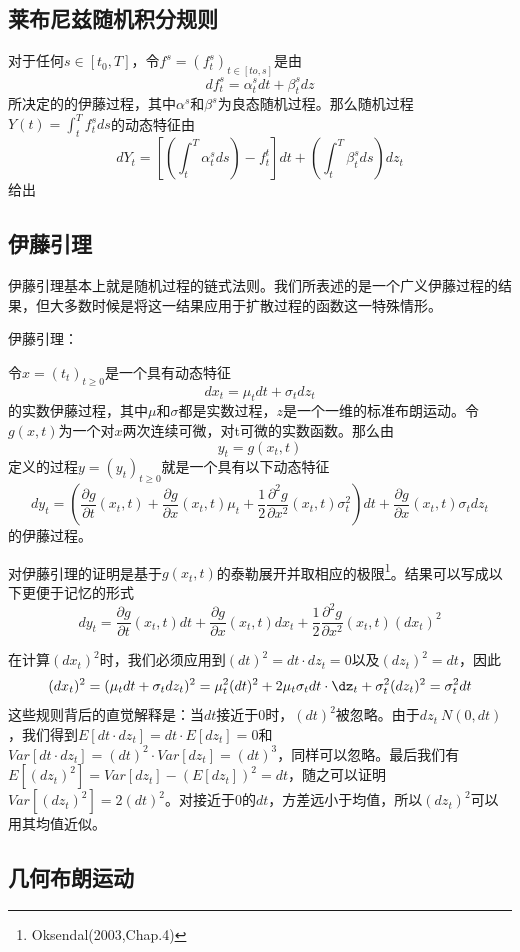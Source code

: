 \documentclass[UTF8]{ctexart}
\newcommand \qd[1] {\begin{qds} {#1} \end{qds}}
\begin{document}
\subsection{莱布尼兹随机积分规则}

对于任何$s \in [t_0,T]$，令$f^s=(f_t^s)_{t \in [to,s]}$是由$$df_t^s=\alpha_t^s dt+\beta_t^s dz$$所决定的的伊藤过程，其中$\alpha^s$和$\beta^s$为良态随机过程。那么随机过程$Y(t)=\int_t^T f_t^s ds$的动态特征由$$dY_t=[(\int_t^T \alpha_t^s ds)-f_t^t]dt+(\int_t^T \beta_t^s ds)dz_t$$给出

\subsection{伊藤引理}

伊藤引理基本上就是随机过程的链式法则。我们所表述的是一个广义伊藤过程的结果，但大多数时候是将这一结果应用于扩散过程的函数这一特殊情形。

\qd{伊藤引理：}令$x=(t_t)_{t \geqslant 0}$是一个具有动态特征$$dx_t=\mu_t dt +\sigma_t dz_t$$的实数伊藤过程，其中$\mu$和$\sigma$都是实数过程，$z$是一个一维的标准布朗运动。令$g(x,t)$为一个对$x$两次连续可微，对t可微的实数函数。那么由$$y_t=g(x_t,t)$$定义的过程$y=(y_t)_{t \geqslant 0}$就是一个具有以下动态特征$$dy_t=(\frac{\partial g}{\partial t}(x_t,t) 
+ \frac{\partial g}{\partial x}(x_t,t) \mu_t 
+ \frac{1}{2}\frac{\partial^2 g}{\partial x^2}(x_t,t) \sigma_t^2)dt
+\frac{\partial g}{\partial x}(x_t,t) \sigma_t dz_t$$的伊藤过程。

对伊藤引理的证明是基于$g(x_t,t)$的泰勒展开并取相应的极限\footnote{Oksendal(2003,Chap.4)}。结果可以写成以下更便于记忆的形式
$$dy_t=\frac{\partial g}{\partial t}(x_t,t) dt
+\frac{\partial g}{\partial x}(x_t,t) dx_t
+\frac{1}{2} \frac{\partial^2 g}{\partial x^2}(x_t,t)(dx_t)^2$$

在计算$(dx_t)^2$时，我们必须应用到$(dt)^2=dt \cdot dz_t =0$以及$(dz_t)^2=dt$，因此
$$(dx_t)^2=(\mu_t dt+\sigma_t dz_t)^2=\mu^2_t (dt)^2 +2 \mu_t \sigma_t dt \cdot \dz_t + \sigma^2_t (dz_t)^2=\sigma^2_tdt$$
这些规则背后的直觉解释是：当$dt$接近于0时，$(dt)^2$被忽略。由于$dz_t~N(0,dt)$，我们得到$E[dt \cdot dz_t]=dt \cdot E[dz_t]=0$和$Var[dt \cdot dz_t]=(dt)^2 \cdot Var[dz_t]=(dt)^3$，同样可以忽略。最后我们有$E[(dz_t)^2]=Var[dz_t]-(E[dz_t])^2=dt$，随之可以证明$Var[(dz_t)^2]=2(dt)^2$。对接近于0的$dt$，方差远小于均值，所以$(dz_t)^2$可以用其均值近似。

\subsection{几何布朗运动}
\end{document}
